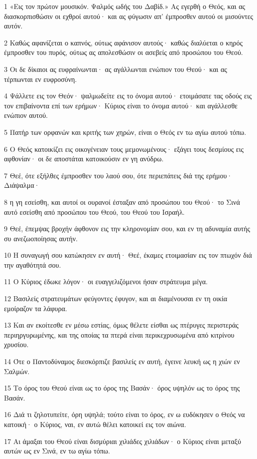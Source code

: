 \par 1 «Εις τον πρώτον μουσικόν. Ψαλμός ωδής του Δαβίδ.» Ας εγερθή ο Θεός, και ας διασκορπισθώσιν οι εχθροί αυτού· και ας φύγωσιν απ' έμπροσθεν αυτού οι μισούντες αυτόν.
\par 2 Καθώς αφανίζεται ο καπνός, ούτως αφάνισον αυτούς· καθώς διαλύεται ο κηρός έμπροσθεν του πυρός, ούτως ας απολεσθώσιν οι ασεβείς από προσώπου του Θεού.
\par 3 Οι δε δίκαιοι ας ευφραίνωνται· ας αγάλλωνται ενώπιον του Θεού· και ας τέρπωνται εν ευφροσύνη.
\par 4 Ψάλλετε εις τον Θεόν· ψαλμωδείτε εις το όνομα αυτού· ετοιμάσατε τας οδούς εις τον επιβαίνοντα επί των ερήμων· Κύριος είναι το όνομα αυτού· και αγάλλεσθε ενώπιον αυτού.
\par 5 Πατήρ των ορφανών και κριτής των χηρών, είναι ο Θεός εν τω αγίω αυτού τόπω.
\par 6 Ο Θεός κατοικίζει εις οικογένειαν τους μεμονωμένους· εξάγει τους δεσμίους εις αφθονίαν· οι δε αποστάται κατοικούσιν εν γη ανύδρω.
\par 7 Θεέ, ότε εξήλθες έμπροσθεν του λαού σου, ότε περιεπάτεις διά της ερήμου· Διάψαλμα·
\par 8 η γη εσείσθη, και αυτοί οι ουρανοί έσταξαν από προσώπου του Θεού· το Σινά αυτό εσείσθη από προσώπου του Θεού, του Θεού του Ισραήλ.
\par 9 Θεέ, έπεμψας βροχήν άφθονον εις την κληρονομίαν σου, και εν τη αδυναμία αυτής συ ανεζωοποίησας αυτήν.
\par 10 Η συναγωγή σου κατώκησεν εν αυτή· Θεέ, έκαμες ετοιμασίαν εις τον πτωχόν διά την αγαθότητά σου.
\par 11 Ο Κύριος έδωκε λόγον· οι ευαγγελιζόμενοι ήσαν στράτευμα μέγα.
\par 12 Βασιλείς στρατευμάτων φεύγοντες έφυγον, και αι διαμένουσαι εν τη οικία εμοίραζον τα λάφυρα.
\par 13 Και αν εκοίτεσθε εν μέσω εστίας, όμως θέλετε είσθαι ως πτέρυγες περιστεράς περιηργυρωμένης, και της οποίας τα πτερά είναι περικεχρυσωμένα από κιτρίνου χρυσίου.
\par 14 Ότε ο Παντοδύναμος διεσκόρπιζε βασιλείς εν αυτή, έγεινε λευκή ως η χιών εν Σαλμών.
\par 15 Το όρος του Θεού είναι ως το όρος της Βασάν· όρος υψηλόν ως το όρος της Βασάν.
\par 16 Διά τι ζηλοτυπείτε, όρη υψηλά; τούτο είναι το όρος, εν ω ευδόκησεν ο Θεός να κατοική· ο Κύριος, ναι, εν αυτώ θέλει κατοικεί εις τον αιώνα.
\par 17 Αι άμαξαι του Θεού είναι δισμύριαι χιλιάδες χιλιάδων· ο Κύριος είναι μεταξύ αυτών ως εν Σινά, εν τω αγίω τόπω.
